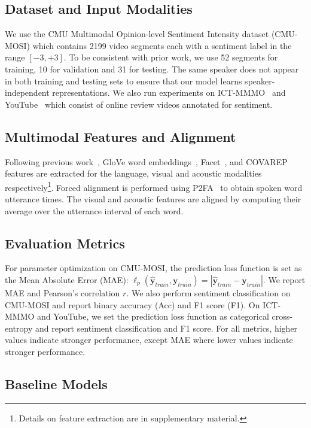 \documentclass[letterpaper]{article} %
\newcommand{\citep}{\cite}
\begin{document}
\subsection{Dataset and Input Modalities}
\label{sec:MOSI}
We use the CMU Multimodal Opinion-level Sentiment Intensity dataset (CMU-MOSI) which contains 2199 video segments each with a sentiment label in the range $[-3,+3]$. To be consistent with prior work, we use 52 segments for training, 10 for validation and 31 for testing. The same speaker does not appear in both training and testing sets to ensure that our model learns speaker-independent representations. We also run experiments on ICT-MMMO~\citep{wollmer2013youtube} and YouTube~\citep{morency2011towards} which consist of online review videos annotated for sentiment.

\subsection{Multimodal Features and Alignment}
Following previous work~\citep{multistage}, GloVe word embeddings~\citep{pennington2014glove}, Facet~\citep{emotient}, and COVAREP~\citep{degottex2014covarep} features are extracted for the language, visual and acoustic modalities respectively\footnote{Details on feature extraction are in supplementary material.}. Forced alignment is performed using P2FA~\citep{P2FA} to obtain spoken word utterance times. The visual and acoustic features are aligned by computing their average over the utterance interval of each word.

\subsection{Evaluation Metrics}
For parameter optimization on CMU-MOSI, the prediction loss function is set as the Mean Absolute Error (MAE): $\ell_p (\hat{\mathbf{y}}_{train},\mathbf{y}_{train}) = |\hat{\mathbf{y}}_{train}-\mathbf{y}_{train}|$. We report MAE and Pearson's correlation $r$. We also perform sentiment classification on CMU-MOSI and report binary accuracy (Acc) and F1 score (F1). On ICT-MMMO and YouTube, we set the prediction loss function as categorical cross-entropy and report sentiment classification and F1 score. For all metrics, higher values indicate stronger performance, except MAE where lower values indicate stronger performance. 

\subsection{Baseline Models}
\label{sec:base}
\end{document}
